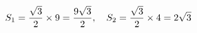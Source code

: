 \documentclass[preview]{standalone}
\begin{document}
\begin{align*}
\special{dvisvgm:raw <g id='unique000'>}S_1=\frac{\sqrt{3}}{2}\times 9=\frac{9\sqrt{3}}{2},\quad S_2=\frac{\sqrt{3}}{2}\times 4=2\sqrt{3}\special{dvisvgm:raw </g>}
\end{align*}
\end{document}
